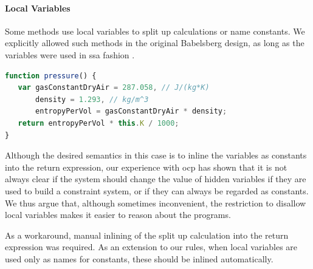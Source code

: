 \documentclass[10pt,reprint]{sigplanconf-preprint}
\newcommand{\ac}[1]{\gls*{#1}}
\newcommand{\javascript}{JavaScript\xspace}
\begin{document}
\paragraph{Local Variables }
\label{sec:local-variables}
Some methods use local variables to split up calculations or name
constants.  We explicitly allowed such methods in the original Babelsberg
design, as long as the variables were used in \ac{ssa} fashion
\cite{FelgentreffJOT14}.
\begin{lstlisting}[language=JavaScript,caption={~},label=lst:airPressure]
function pressure() {
   var gasConstantDryAir = 287.058, // J/(kg*K)
       density = 1.293, // kg/m^3
       entropyPerVol = gasConstantDryAir * density;
   return entropyPerVol * this.K / 1000;
}
\end{lstlisting}
Although the desired semantics in this case is to inline the variables
as constants into the return expression, our experience with \ac{ocp}
has shown that it is not always clear if the system should change the
value of hidden variables if they are used to build a constraint
system, or if they can always be regarded as constants.  We thus argue
that, although sometimes inconvenient, the restriction to disallow
local variables makes it easier to reason about the programs.

As a workaround, manual inlining of the split up calculation into the
return expression was required. As an extension to our rules, when
local variables are used only as names for constants, these should be
inlined automatically.

\end{document}
